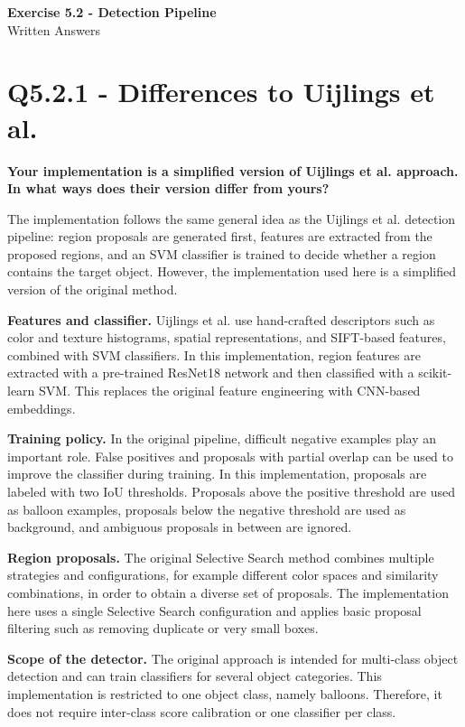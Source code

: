 \documentclass[11pt,a4paper]{article}
\begin{document}
\begin{center}
{\Large \textbf{Exercise 5.2 - Detection Pipeline}}\\[0.5em]
{\normalsize Written Answers}
\end{center}

\section*{Q5.2.1 - Differences to Uijlings et al.}
\textbf{Your implementation is a simplified version of Uijlings et al. approach. In what ways does their version differ from yours?}

The implementation follows the same general idea as the Uijlings et al. detection pipeline: region proposals are generated first, features are extracted from the proposed regions, and an SVM classifier is trained to decide whether a region contains the target object. However, the implementation used here is a simplified version of the original method.

\textbf{Features and classifier.} Uijlings et al. use hand-crafted descriptors such as color and texture histograms, spatial representations, and SIFT-based features, combined with SVM classifiers. In this implementation, region features are extracted with a pre-trained ResNet18 network and then classified with a scikit-learn SVM. This replaces the original feature engineering with CNN-based embeddings.

\textbf{Training policy.} In the original pipeline, difficult negative examples play an important role. False positives and proposals with partial overlap can be used to improve the classifier during training. In this implementation, proposals are labeled with two IoU thresholds. Proposals above the positive threshold are used as balloon examples, proposals below the negative threshold are used as background, and ambiguous proposals in between are ignored.

\textbf{Region proposals.} The original Selective Search method combines multiple strategies and configurations, for example different color spaces and similarity combinations, in order to obtain a diverse set of proposals. The implementation here uses a single Selective Search configuration and applies basic proposal filtering such as removing duplicate or very small boxes.

\textbf{Scope of the detector.} The original approach is intended for multi-class object detection and can train classifiers for several object categories. This implementation is restricted to one object class, namely balloons. Therefore, it does not require inter-class score calibration or one classifier per class.
\end{document}
